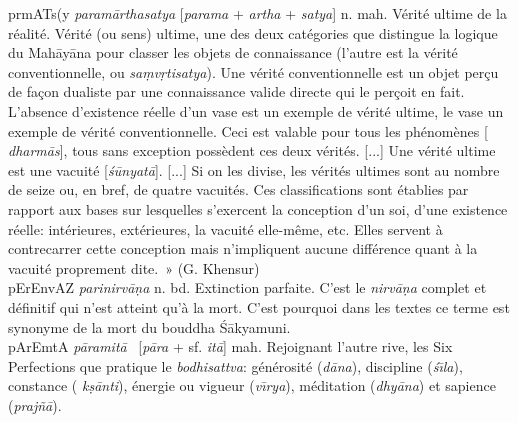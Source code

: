 \documentclass[a4paper,11pt,twocolumn]{article}
\begin{document}
{\dn prmAT\0s(y} {\em param\={a}rthasatya} [{\em parama} +
{\em artha} + {\em satya}] n. mah. \og Vérité ultime de la réalité\fg.
Vérité (ou sens) ultime, une des deux catégories que distingue la
logique du Mah\={a}y\={a}na pour classer les objets de
connaissance (l'autre est la vérité conventionnelle, ou
{\em sa\d{m}v\d{r}tisatya}). \og Une vérité conventionnelle est un objet
per\c{c}u de fa\c{c}on dualiste par une connaissance valide directe
qui le per\c{c}oit en fait. L'absence d'existence réelle d'un vase est
un exemple de vérité ultime, le vase un exemple de vérité
conventionnelle. Ceci est valable pour tous les phénomènes [{\em
dharm\={a}s}], tous sans exception possèdent ces deux vérités. [...]
Une vérité ultime est une vacuité [{\em \'{s}\={u}nyat\={a}}]. [...]
Si on les divise, les
vérités ultimes sont au nombre de seize ou, en bref, de quatre
vacuités. Ces classifications sont établies par rapport aux bases sur
lesquelles s'exercent la conception d'un soi, d'une existence réelle:
intérieures, extérieures, la vacuité elle-même, etc. Elles servent à
contrecarrer cette conception mais n'impliquent aucune différence
quant à la vacuité proprement dite.~» (G. Khensur) \\

{\dn pErEnvA\0Z} {\em parinirv\={a}\d{n}a} n. bd. \og Extinction
parfaite\fg. C'est le {\em nirv\={a}\d{n}a} complet et définitif qui
n'est atteint qu'à la mort. C'est pourquoi dans les textes ce terme
est synonyme de la mort du bouddha \'{S}\={a}kyamuni. \\

{\dn pArEmtA} {\em p\={a}ramit\={a}} \ [{\em p\={a}ra} +
sf. {\em it\={a}}]  mah. \og Rejoignant l'autre rive\fg, les Six
Perfections que pratique le {\em bodhisattva\/}: générosité
({\em d\={a}na}), discipline ({\em \'{s}\={\i}la}), constance ({\em
k\d{s}\={a}nti}), énergie ou vigueur ({\em v\={\i}rya}), méditation
({\em dhy\={a}na}) et sapience ({\em prajñ\={a}}). \\
\end{document}
